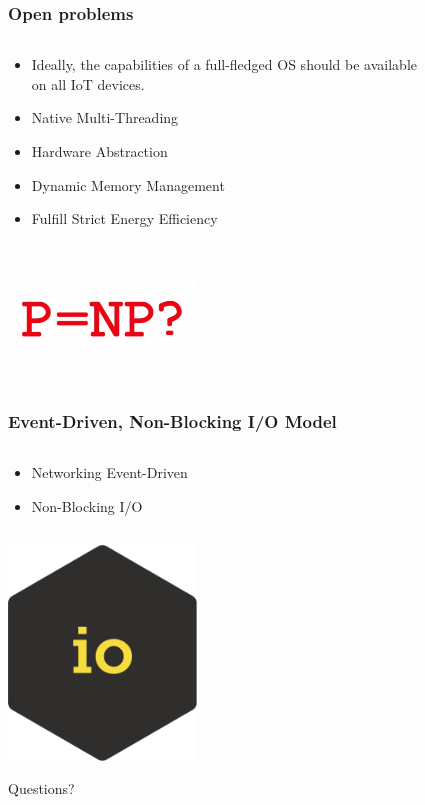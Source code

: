 \documentclass{beamer}
\begin{document}
\begin{frame}
	\frametitle{Open problems}
	\begin{columns}[c]
		\begin{column}{30cm}
			\vspace{.1cm}
			\begin{itemize}
				\justifying
				\item Ideally, the capabilities of a full-fledged OS should be available\\
				on all IoT devices.
				\item Native Multi-Threading
				\item Hardware Abstraction
				\item Dynamic Memory Management
				\item Fulfill Strict Energy Efficiency
			\end{itemize}
		\end{column}
	\end{columns}
	\vspace{.5cm}
	\hspace*{5.5cm} \includegraphics[width=5cm]{figs/open-problems.jpg}
\end{frame}

\begin{frame}
	\frametitle{Event-Driven, Non-Blocking I/O Model}
	\begin{columns}[c]
		\begin{column}{30cm}
			\vspace{.1cm}
			\begin{itemize}
				\justifying
				\item Networking Event-Driven
				\item Non-Blocking I/O
			\end{itemize}
		\end{column}
	\end{columns}
	\vspace{.5cm}
	\hspace*{5.5cm} \includegraphics[width=5cm]{figs/io.png}
\end{frame}

\begin{frame}
	\vspace{1cm}
	\begin{Huge}
		\begin{center}
			Questions?
		\end{center}
	\end{Huge}
\end{frame}
\end{document}
